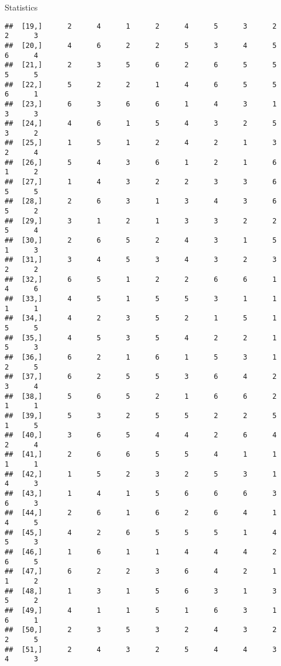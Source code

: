 \documentclass[
  ignorenonframetext,
]{beamer}
\begin{document}
\begin{frame}[fragile]{Statistics}
\begin{verbatim}
##  [19,]      2      4      1      2      4      5      3      2      2      3
##  [20,]      4      6      2      2      5      3      4      5      6      4
##  [21,]      2      3      5      6      2      6      5      5      5      5
##  [22,]      5      2      2      1      4      6      5      5      6      1
##  [23,]      6      3      6      6      1      4      3      1      3      3
##  [24,]      4      6      1      5      4      3      2      5      3      2
##  [25,]      1      5      1      2      4      2      1      3      2      4
##  [26,]      5      4      3      6      1      2      1      6      1      2
##  [27,]      1      4      3      2      2      3      3      6      5      5
##  [28,]      2      6      3      1      3      4      3      6      5      2
##  [29,]      3      1      2      1      3      3      2      2      5      4
##  [30,]      2      6      5      2      4      3      1      5      1      3
##  [31,]      3      4      5      3      4      3      2      3      2      2
##  [32,]      6      5      1      2      2      6      6      1      4      6
##  [33,]      4      5      1      5      5      3      1      1      1      1
##  [34,]      4      2      3      5      2      1      5      1      5      5
##  [35,]      4      5      3      5      4      2      2      1      5      3
##  [36,]      6      2      1      6      1      5      3      1      2      5
##  [37,]      6      2      5      5      3      6      4      2      3      4
##  [38,]      5      6      5      2      1      6      6      2      1      1
##  [39,]      5      3      2      5      5      2      2      5      1      5
##  [40,]      3      6      5      4      4      2      6      4      2      4
##  [41,]      2      6      6      5      5      4      1      1      1      1
##  [42,]      1      5      2      3      2      5      3      1      4      3
##  [43,]      1      4      1      5      6      6      6      3      6      3
##  [44,]      2      6      1      6      2      6      4      1      4      5
##  [45,]      4      2      6      5      5      5      1      4      5      3
##  [46,]      1      6      1      1      4      4      4      2      6      5
##  [47,]      6      2      2      3      6      4      2      1      1      2
##  [48,]      1      3      1      5      6      3      1      3      5      2
##  [49,]      4      1      1      5      1      6      3      1      6      1
##  [50,]      2      3      5      3      2      4      3      2      2      5
##  [51,]      2      4      3      2      5      4      4      3      4      3

\end{verbatim}
\end{frame}
\end{document}
